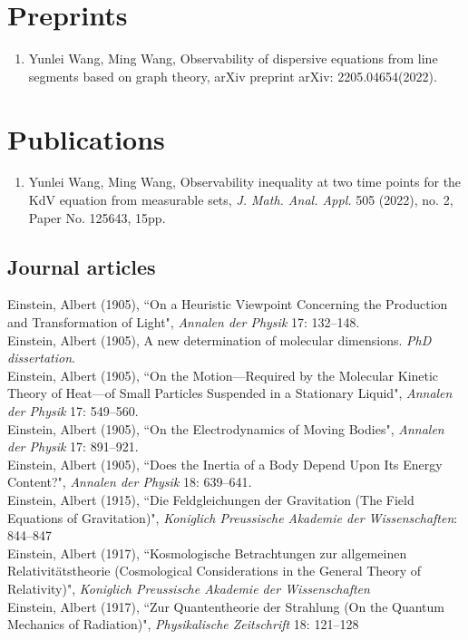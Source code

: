 \documentclass[11pt]{article} %
\begin{document}
\section*{Preprints}
\begin{enumerate}
  \leftskip-0.13in
\item Yunlei Wang, Ming Wang, Observability of dispersive equations from line segments based on graph theory, arXiv preprint arXiv: 2205.04654(2022).
\end{enumerate}

\section*{Publications}
\begin{enumerate}
\leftskip-0.13in
\item Yunlei Wang, Ming Wang, Observability inequality at two time points for the KdV equation from measurable sets, \emph{J. Math. Anal. Appl.} 505 (2022), no. 2, Paper No. 125643, 15pp.
\end{enumerate}
\iffalse
\subsection*{Journal articles}


Einstein, Albert (1905), “On a Heuristic Viewpoint Concerning the Production and Transformation of Light", \emph{Annalen der Physik} 17: 132–148.\\
Einstein, Albert (1905), A new determination of molecular dimensions. \emph{PhD dissertation}.\\
Einstein, Albert (1905), “On the Motion—Required by the Molecular Kinetic Theory of Heat—of Small Particles Suspended in a Stationary Liquid", \emph{Annalen der Physik} 17: 549–560.\\
Einstein, Albert (1905), “On the Electrodynamics of Moving Bodies", \emph{Annalen der Physik} 17: 891–921.\\
Einstein, Albert (1905), “Does the Inertia of a Body Depend Upon Its Energy Content?", \emph{Annalen der Physik} 18: 639–641.\\
Einstein, Albert (1915), “Die Feldgleichungen der Gravitation (The Field Equations of Gravitation)", \emph{Koniglich Preussische Akademie der Wissenschaften}: 844–847\\
Einstein, Albert (1917), “Kosmologische Betrachtungen zur allgemeinen Relativitätstheorie (Cosmological Considerations in the General Theory of Relativity)", \emph{Koniglich Preussische Akademie der Wissenschaften}\\
Einstein, Albert (1917), “Zur Quantentheorie der Strahlung (On the Quantum Mechanics of Radiation)", \emph{Physikalische Zeitschrift} 18: 121–128
\end{document}
